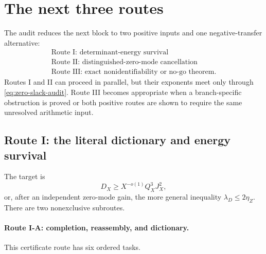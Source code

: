 \section{The next three routes}
\label{sec:decision-tree}

The audit reduces the next block to two positive inputs and one
negative-transfer alternative:
\begin{equation}
\boxed{
\begin{gathered}
\text{Route I: determinant-energy survival}\\
\text{Route II: distinguished-zero-mode cancellation}\\
\text{Route III: exact nonidentifiability or no-go theorem.}
\end{gathered}}
\label{eq:three-routes}
\end{equation}
Routes I and II can proceed in parallel, but their exponents meet only
through \eqref{eq:zero-slack-audit}.  Route III becomes appropriate
when a branch-specific obstruction is proved or both positive routes
are shown to require the same unresolved arithmetic input.

\subsection{Route I: the literal dictionary and energy survival}

The target is
\begin{equation}
 D_X\ge X^{-o(1)}Q_X^3J_X^2,
\label{eq:routeI-natural-energy}
\end{equation}
or, after an independent zero-mode gain, the more general inequality
\(\lambda_D\le2\eta_Z\).  There are two nonexclusive subroutes.

\paragraph{Route I-A: completion, reassembly, and dictionary.}
This certificate route has six ordered tasks.

